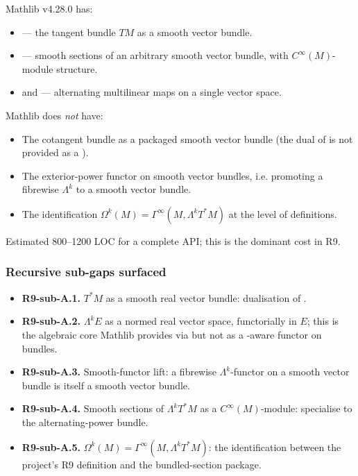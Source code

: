 Mathlib v4.28.0 has:
\begin{itemize}
\item {} --- the
  tangent bundle \(TM\) as a smooth vector bundle.
\item {} ---
  smooth sections of an arbitrary smooth vector bundle, with
  \(C^{\infty}(M)\)-module structure.
\item {} and
   --- alternating
  multilinear maps on a single vector space.
\end{itemize}
Mathlib does \emph{not} have:
\begin{itemize}
\item The cotangent bundle as a packaged smooth vector bundle
  (the dual of  is not provided as a
  ).
\item The exterior-power functor on smooth vector bundles, i.e.
  promoting a fibrewise \(\Lambda^{k}\) to a smooth vector bundle.
\item The identification
  \(\Omega^{k}(M)=\Gamma^{\infty}(M,\Lambda^{k}T^{*}M)\) at the
  level of definitions.
\end{itemize}
Estimated 800--1200 LOC for a complete API; this is the dominant
cost in R9.

\subsubsection*{Recursive sub-gaps surfaced}

\begin{itemize}
\item \textbf{R9-sub-A.1.}  \(T^{*}M\) as a smooth real vector
  bundle: dualisation of .
\item \textbf{R9-sub-A.2.}  \(\Lambda^{k}E\) as a normed real vector
  space, functorially in \(E\); this is the algebraic core
  Mathlib provides via  but not as a
  -aware functor on bundles.
\item \textbf{R9-sub-A.3.}  Smooth-functor lift: a fibrewise
  \(\Lambda^{k}\)-functor on a smooth vector bundle is itself a
  smooth vector bundle.
\item \textbf{R9-sub-A.4.}  Smooth sections of
  \(\Lambda^{k}T^{*}M\) as a \(C^{\infty}(M)\)-module: specialise
   to the alternating-power bundle.
\item \textbf{R9-sub-A.5.}  \(\Omega^{k}(M)=\Gamma^{\infty}(M,
  \Lambda^{k}T^{*}M)\): the identification between the project's
  R9 definition and the bundled-section package.
\end{itemize}

